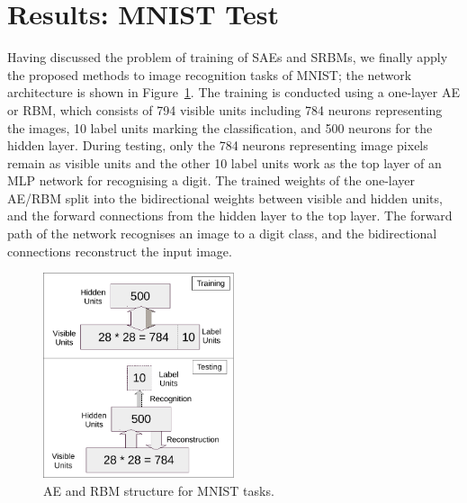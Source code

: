 \section{Results: MNIST Test}
Having discussed the problem of training of SAEs and SRBMs, we finally apply the proposed methods to image recognition tasks of MNIST;
the network architecture is shown in Figure~\ref{fig:MNSIT}.
The training is conducted using a one-layer AE or RBM, which consists of 794 visible units including 784 neurons representing the images, 10 label units marking the classification, and 500 neurons for the hidden layer.
During testing, only the 784 neurons representing image pixels remain as visible units and the other 10 label units work as the top layer of an MLP network for recognising a digit.
The trained weights of the one-layer AE/RBM split into the bidirectional weights between visible and hidden units, and the forward connections from the hidden layer to the top layer.
The forward path of the network recognises an image to a digit class, and the bidirectional connections reconstruct the input image.

\begin{figure}
	\centering
	\includegraphics[width=0.5\textwidth]{pics_sdlm/mnist.pdf}
	\caption{AE and RBM structure for MNIST tasks.}
	\label{fig:MNSIT}
\end{figure}

